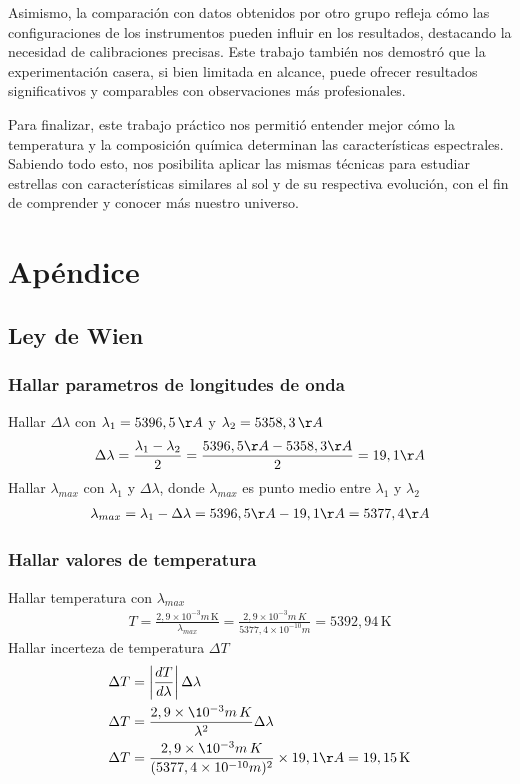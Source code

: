 \documentclass[11pt, a4paper]{article}
\begin{document}
Asimismo, la comparación con datos obtenidos por otro grupo refleja cómo las configuraciones de los instrumentos pueden influir en los resultados, destacando la necesidad de calibraciones precisas. Este trabajo también nos demostró que la experimentación casera, si bien limitada en alcance, puede ofrecer resultados significativos y comparables con observaciones más profesionales.

Para finalizar, este trabajo práctico nos permitió entender mejor cómo la temperatura y la composición química determinan las características espectrales. Sabiendo todo esto, nos posibilita aplicar las mismas técnicas para estudiar estrellas con características similares al sol y de su respectiva evolución, con el fin de comprender y conocer más nuestro universo.

\newpage

\section{Apéndice}
\subsection{Ley de Wien}
\subsubsection{Hallar parametros de longitudes de onda}
Hallar $\Delta \lambda$ con $\lambda_1=5396,5 \, \AA$ y $\lambda_2=5358,3 \, \AA$
 \begin{align}
     \Delta \lambda = \frac{\lambda_1 - \lambda_2}{2} = \frac{5396,5 \AA - 5358,3 \AA}{2} = 19,1 \AA
 \end{align}
Hallar $\lambda _{max}$ con $\lambda _1$ y $\Delta \lambda$, donde $\lambda _{max}$ es punto medio entre $\lambda _1$ y $\lambda _2$
\begin{align}
    \lambda _{max} = \lambda _1 - \Delta \lambda = 5396,5 \AA - 19,1 \AA = 5377,4 \AA
\end{align}

\subsubsection{Hallar valores de temperatura}
Hallar temperatura con $\lambda _{max}$
\begin{align}
    T = \frac{2,9 \times 10^{-3}m \, \text{K}}{\lambda _{max}} = \frac{2,9 \times 10^{-3}m \,K}{5377,4 \times 10^{-10}m} = 5392,94 \, \text{K}
\end{align}
Hallar incerteza de temperatura $\Delta T$
\begin{align}
    \Delta T &= \left | \frac{d T}{d \lambda} \right | \Delta \lambda \\
    \Delta T &= \frac{2,9 \times \10^{-3}m \, K}{\lambda ^2} \Delta \lambda \\ 
    \Delta T &= \frac{2,9 \times \10^{-3}m \, K}{(5377,4 \times 10^{-10}m)^2} \times 19,1 \AA = 19,15 \, \text{K}
\end{align}
\end{document}

